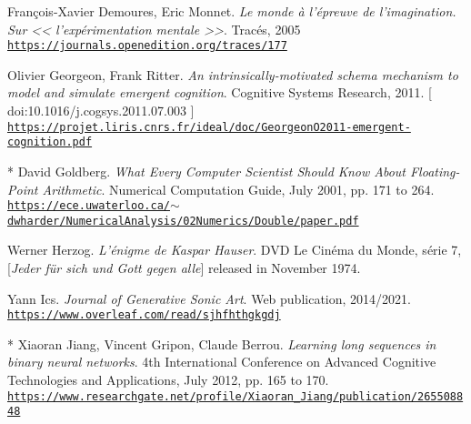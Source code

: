 \begin{thebibliography}{99}
	 François-Xavier Demoures, Eric Monnet. \textit{Le monde à l’épreuve de l’imagination. Sur << l’expérimentation mentale >>}. Tracés, 2005 \\ \href{https://journals.openedition.org/traces/177}{\scriptsize{\texttt{https://journals.openedition.org/traces/177}}} \normalsize{}
	 
	 Olivier Georgeon, Frank Ritter. \textit{An intrinsically-motivated schema mechanism to model and simulate emergent cognition}. 
	 Cognitive Systems Research, 2011. {\scriptsize [ doi:10.1016/j.cogsys.2011.07.003 ]}
	 \\ \href{https://projet.liris.cnrs.fr/ideal/doc/GeorgeonO2011-emergent-cognition.pdf}{\scriptsize{\texttt{https://projet.liris.cnrs.fr/ideal/doc/GeorgeonO2011-emergent-cognition.pdf}}} \normalsize{}
	 
	 
	 * David Goldberg. \textit{What Every Computer Scientist Should Know About Floating-Point Arithmetic}. Numerical Computation Guide, July 2001, pp. 171 to 264.\\ \href{https://ece.uwaterloo.ca/\~dwharder/NumericalAnalysis/02Numerics/Double/paper.pdf}{\scriptsize{\texttt{https://ece.uwaterloo.ca/$\sim$dwharder/NumericalAnalysis/02Numerics/Double/paper.pdf}}} \normalsize{}
	 
	 Werner Herzog. \textit{L'énigme de Kaspar Hauser}. DVD Le Cinéma du Monde, série 7, [\textit{Jeder für sich und Gott gegen alle}] released in November 1974.
	 
	 Yann Ics. \textit{Journal of Generative Sonic Art}. Web publication, 2014/2021.\\ \href{https://www.overleaf.com/read/sjhfhthgkgdj}{\scriptsize{\texttt{https://www.overleaf.com/read/sjhfhthgkgdj}}} \normalsize{}
	
	 * Xiaoran Jiang, Vincent Gripon, Claude Berrou. \textit{Learning long sequences in binary neural networks}. 4th International Conference on Advanced Cognitive Technologies and Applications, July 2012, pp. 165 to 170.\\ \href{https://www.researchgate.net/profile/Xiaoran\_Jiang/publication/265508848\_Learning\_Long\_Sequences\_in\_Binary\_Neural\_Networks/links/54107a6c0cf2f2b29a410d8c.pdf}{\scriptsize{\texttt{https://www.researchgate.net/profile/Xiaoran\_Jiang/publication/265508848}}} \normalsize{}
	 

\end{thebibliography}
